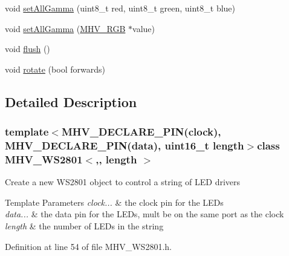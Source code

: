 \begin{DoxyCompactItemize}
\item 
void \hyperlink{class_m_h_v___w_s2801_ae0eb5a3d00841ccc8b74626c76022e74}{set\-All\-Gamma} (uint8\-\_\-t red, uint8\-\_\-t green, uint8\-\_\-t blue)
\item 
void \hyperlink{class_m_h_v___w_s2801_a888dc45af30f9e1f63c859d7c861ded8}{set\-All\-Gamma} (\hyperlink{_m_h_v___r_g_b_8h_a17bc0cb27c702aac95873e5aab2ead87}{M\-H\-V\-\_\-\-R\-G\-B} $\ast$value)
\item 
void \hyperlink{class_m_h_v___w_s2801_a85d07cd08e319cb92fd9af75a38c95e2}{flush} ()
\item 
void \hyperlink{class_m_h_v___w_s2801_a7988cc542ca4bf3e3d0f386d2efe51be}{rotate} (bool forwards)
\end{DoxyCompactItemize}


\subsection{Detailed Description}
\subsubsection*{template$<$M\-H\-V\-\_\-\-D\-E\-C\-L\-A\-R\-E\-\_\-\-P\-I\-N(clock), M\-H\-V\-\_\-\-D\-E\-C\-L\-A\-R\-E\-\_\-\-P\-I\-N(data), uint16\-\_\-t length$>$class M\-H\-V\-\_\-\-W\-S2801$<$,, length $>$}

Create a new W\-S2801 object to control a string of L\-E\-D drivers 
\begin{DoxyTemplParams}{Template Parameters}
{\em clock...} & the clock pin for the L\-E\-Ds \\
\hline
{\em data...} & the data pin for the L\-E\-Ds, mult be on the same port as the clock \\
\hline
{\em length} & the number of L\-E\-Ds in the string \\
\hline
\end{DoxyTemplParams}


Definition at line 54 of file M\-H\-V\-\_\-\-W\-S2801.\-h.




